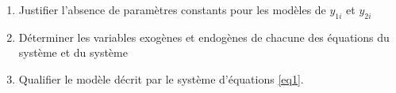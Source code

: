 \begin{enumerate}
    \item Justifier l’absence de paramètres constants pour les modèles de $y_{1i}$ et $y_{2i}$ 
    \item  Déterminer les variables exogènes et endogènes de chacune des équations
    du système et du système
    \item Qualifier le modèle décrit par le système d’équations \eqref{eq1}.
\end{enumerate}



 
